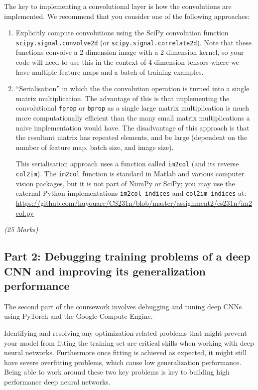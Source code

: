 \documentclass[11pt,]{article}
\begin{document}
The key to implementing a convolutional layer is how the convolutions are implemented. We recommend that you consider one of the following approaches:
\begin{enumerate}
    \item Explicitly compute convolutions using the  SciPy convolution function \texttt{scipy.signal.convolve2d} (or \texttt{scipy.signal.correlate2d}).  Note that these functions convolve a 2-dimension image with a 2-dimension kernel, so your code will need to use this in the context of 4-dimension tensors where we have multiple feature maps and a batch of training examples.\newpage
    \item ``Serialisation'' in which the the convolution operation is turned into a single matrix multiplication.  The advantage of this is that implementing the convolutional \texttt{fprop} or \texttt{bprop} as a single large matrix multiplication is much more computationally efficient than the many small matrix multiplications a naive implementation would have.  The disadvantage of this approach is that the resultant matrix has repeated elements, and be large (dependent on the number of feature map, batch size, and image size).  
    
    This serialisation  approach uses a function called \texttt{im2col} (and its reverse \texttt{col2im}).  The \texttt{im2col} function is standard in Matlab and various computer vision packages, but it is not part of NumPy or SciPy; you may use the external Python implementations \texttt{im2col\_indices} and \texttt{col2im\_indices} at:\\ \url{https://github.com/huyouare/CS231n/blob/master/assignment2/cs231n/im2col.py}
\end{enumerate}

\emph{(25 Marks)}

\subsection{Part 2: Debugging training problems of a deep CNN and improving its generalization performance}
\label{sec:pytorch}
The second part of the coursework involves debugging and tuning deep CNNs using PyTorch and the Google Compute Engine.

Identifying and resolving any optimization-related problems that might prevent your model from fitting the training set are critical skills when working with deep neural networks. Furthermore once fitting is achieved as expected, it might still have severe overfitting problems, which cause low generalization performance. Being able to work around these two key problems is key to building high performance deep neural networks.
\end{document}
